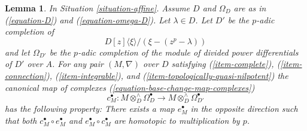 \documentclass{stacks-project}
\theoremstyle{plain}
\newtheorem{lemma}[subsection]{Lemma}
\theoremstyle{definition}
\theoremstyle{remark}
\numberwithin{equation}{subsection}
\begin{document}
\begin{lemma}
\label{lemma-computation}
In Situation \ref{situation-affine}. Assume $D$ and $\Omega_D$ are as in
(\ref{equation-D}) and (\ref{equation-omega-D}).
Let $\lambda \in D$. Let $D'$ be the $p$-adic completion of
$$
D[z]\langle \xi \rangle/(\xi - (z^p - \lambda))
$$
and let $\Omega_{D'}$ be the $p$-adic completion of the module of
divided power differentials of $D'$ over $A$. For any pair $(M, \nabla)$
over $D$ satisfying (\ref{item-complete}), (\ref{item-connection}),
(\ref{item-integrable}), and (\ref{item-topologically-quasi-nilpotent})
the canonical map of complexes (\ref{equation-base-change-map-complexes})
$$
c_M^\bullet : M \otimes_D^\wedge \Omega^\bullet_D
\longrightarrow
M \otimes_D^\wedge \Omega^\bullet_{D'}
$$
has the following property: There exists a map $e_M^\bullet$
in the opposite direction such that both $c_M^\bullet \circ e_M^\bullet$
and $e_M^\bullet \circ c_M^\bullet$ are homotopic to multiplication by $p$.
\end{lemma}
\end{document}
